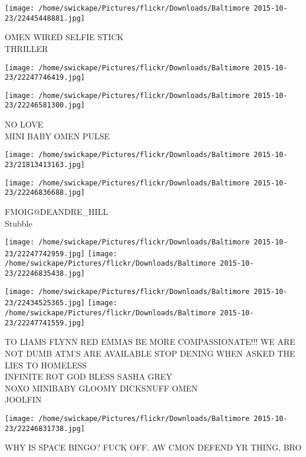 \documentclass[10pt,letterpaper]{article}
\begin{document}
\vspace{0.25in}
\texttt{[image: /home/swickape/Pictures/flickr/Downloads/Baltimore 2015-10-23/22445448881.jpg]}

OMEN WIRED SELFIE STICK\\
THRILLER
\pagebreak

\texttt{[image: /home/swickape/Pictures/flickr/Downloads/Baltimore 2015-10-23/22247746419.jpg]}

\vspace{0.25in}
\texttt{[image: /home/swickape/Pictures/flickr/Downloads/Baltimore 2015-10-23/22246581300.jpg]}

NO LOVE\\
MINI BABY OMEN PULSE
\pagebreak

\texttt{[image: /home/swickape/Pictures/flickr/Downloads/Baltimore 2015-10-23/21813413163.jpg]}

\vspace{0.25in}
\texttt{[image: /home/swickape/Pictures/flickr/Downloads/Baltimore 2015-10-23/22246836688.jpg]}

FMOIG@DEANDRE\_HILL\\
Stubble
\pagebreak

\texttt{[image: /home/swickape/Pictures/flickr/Downloads/Baltimore 2015-10-23/22247742959.jpg]}
\texttt{[image: /home/swickape/Pictures/flickr/Downloads/Baltimore 2015-10-23/22246835438.jpg]}

\texttt{[image: /home/swickape/Pictures/flickr/Downloads/Baltimore 2015-10-23/22434525365.jpg]}
\texttt{[image: /home/swickape/Pictures/flickr/Downloads/Baltimore 2015-10-23/22247741559.jpg]}

TO LIAMS FLYNN RED EMMAS BE MORE COMPASSIONATE!!! WE ARE NOT DUMB ATM'S ARE AVAILABLE STOP DENING WHEN ASKED THE LIES TO HOMELESS\\
INFINITE ROT GOD BLESS SASHA GREY\\
NOXO MINIBABY GLOOMY DICKSNUFF OMEN\\
JOOLFIN
\pagebreak

\texttt{[image: /home/swickape/Pictures/flickr/Downloads/Baltimore 2015-10-23/22246831738.jpg]}

WHY IS SPACE BINGO?  FUCK OFF.  AW CMON DEFEND YR THING, BRO
\pagebreak
\end{document}

